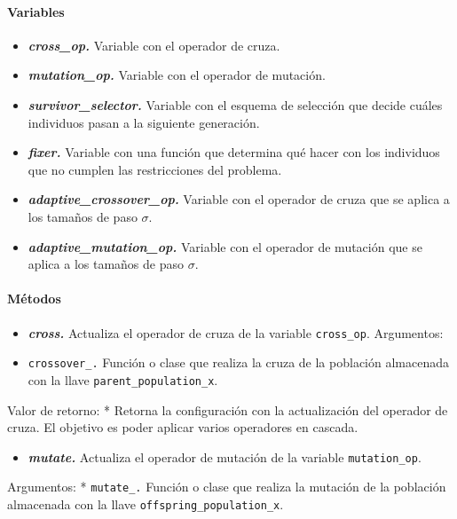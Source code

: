 \documentclass[11pt]{article}
\providecommand{\tightlist}{%
      \setlength{\itemsep}{0pt}\setlength{\parskip}{0pt}}
\begin{document}
\paragraph{Variables}\label{variables}

\begin{itemize}
\tightlist
\item
  \emph{\textbf{cross\_op.}} Variable con el operador de cruza.
\item
  \emph{\textbf{mutation\_op.}} Variable con el operador de mutación.
\item
  \emph{\textbf{survivor\_selector.}} Variable con el esquema de
  selección que decide cuáles individuos pasan a la siguiente
  generación.
\item
  \emph{\textbf{fixer.}} Variable con una función que determina qué
  hacer con los individuos que no cumplen las restricciones del
  problema.
\item
  \emph{\textbf{adaptive\_crossover\_op.}} Variable con el operador de
  cruza que se aplica a los tamaños de paso \(\sigma\).
\item
  \emph{\textbf{adaptive\_mutation\_op.}} Variable con el operador de
  mutación que se aplica a los tamaños de paso \(\sigma\).
\end{itemize}

\paragraph{Métodos}\label{muxe9todos}

\begin{itemize}
\tightlist
\item
  \emph{\textbf{cross.}} Actualiza el operador de cruza de la variable
  \texttt{cross\_op}. Argumentos:
\item
  \texttt{crossover\_.} Función o clase que realiza la cruza de la
  población almacenada con la llave \texttt{parent\_population\_x}.
\end{itemize}

Valor de retorno: * Retorna la configuración con la actualización del
operador de cruza. El objetivo es poder aplicar varios operadores en
cascada.

\begin{itemize}
\tightlist
\item
  \emph{\textbf{mutate.}} Actualiza el operador de mutación de la
  variable \texttt{mutation\_op}.
\end{itemize}

Argumentos: * \texttt{mutate\_.} Función o clase que realiza la mutación
de la población almacenada con la llave
\texttt{offspring\_population\_x}.
\end{document}

